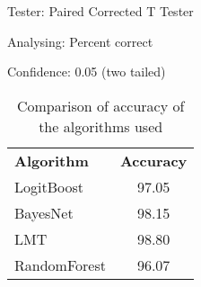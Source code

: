 
\vspace{10pt}
Tester:     Paired Corrected T Tester

Analysing:  Percent correct

Confidence: 0.05 (two tailed)

%




\begin{table}[h]
\centering
\begin{tabular}{l c}
\textbf{Algorithm} & \textbf{Accuracy} \\
LogitBoost 	&	97.05 \\
BayesNet 	&	98.15 \\
LMT			&	98.80 \\
RandomForest &	96.07 \\

\end{tabular}
\caption{Comparison of accuracy of the algorithms used}
\end{table}



